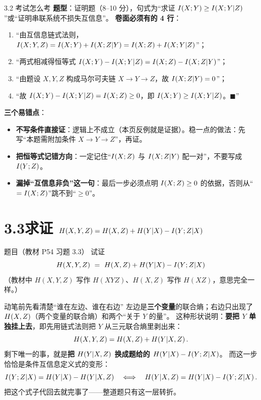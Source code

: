 \documentclass[11pt,a4paper]{ctexart}
\begin{document}
\begin{exam}{3.2 考试怎么考}
\textbf{题型}：证明题（8--10 分），句式为“求证 $I\!\left(X;Y\right)\ge I\!\left(X;Y|Z\right)$”或“证明串联系统不损失互信息”。
\textbf{卷面必须有的 4 行}：
\begin{enumerate}[leftmargin=1.7em,itemsep=1pt,topsep=1pt]
  \item “由互信息链式法则，$I\!\left(X;Y,Z\right)=I\!\left(X;Y\right)+I\!\left(X;Z|Y\right)=I\!\left(X;Z\right)+I\!\left(X;Y|Z\right)$”；
  \item “两式相减得恒等式 $I\!\left(X;Y\right)-I\!\left(X;Y|Z\right)=I\!\left(X;Z\right)-I\!\left(X;Z|Y\right)$”；
  \item “由题设 $X,Y,Z$ 构成马尔可夫链 $X\to Y\to Z$，故 $I\!\left(X;Z|Y\right)=0$”；
  \item “故 $I\!\left(X;Y\right)-I\!\left(X;Y|Z\right)=I\!\left(X;Z\right)\ge0$，即 $I\!\left(X;Y\right)\ge I\!\left(X;Y|Z\right)$。$\blacksquare$”
\end{enumerate}
\textbf{三个易错点}：
\begin{itemize}[leftmargin=1.5em,itemsep=1pt,topsep=1pt]
  \item \textbf{不写条件直接证}：逻辑上不成立（本页反例就是证据）。稳一点的做法：先写“本题需附加条件 $X\to Y\to Z$”，再证。
  \item \textbf{把恒等式记错方向}：一定记住“$I\!\left(X;Z\right)$ 与 $I\!\left(X;Z|Y\right)$ 配一对”，不要写成 $I\!\left(Y;Z\right)$。
  \item \textbf{漏掉“互信息非负”这一句}：最后一步必须点明 $I\!\left(X;Z\right)\ge0$ 的依据，否则从“$= I\!\left(X;Z\right)$”跳不到“$\ge0$”。
\end{itemize}
\end{exam}

\section{3.3\quad 求证 $H\!\left(X,Y,Z\right)=H\!\left(X,Z\right)+H\!\left(Y|X\right)-I\!\left(Y;Z|X\right)$}

\begin{defbox}{题目（教材 P54 习题 3.3）}
试证
\[
\Hx{X,Y,Z}\ =\ \Hx{X,Z}+\Hx{Y|X}-\I{Y;Z|X}
\]
（教材中 $H(X,Y,Z)$ 写作 $H(XYZ)$、$H(X,Z)$ 写作 $H(XZ)$，意思完全一样。）
\end{defbox}

\begin{idea}{动笔前先看清楚“谁在左边、谁在右边”}
左边是\textbf{三个变量}的联合熵；右边只出现了 $H\!\left(X,Z\right)$（两个变量的联合熵）和两个“关于 $Y$ 的量”。
这种形状说明：\textbf{要把 $Y$ 单独挂上去}，即先用链式法则把 $Y$ 从三元联合熵里剥出来：
\[
H\!\left(X,Y,Z\right)=H\!\left(X,Z\right)+H\!\left(Y|X,Z\right).
\]
剩下唯一的事，就是\textbf{把 $H\!\left(Y|X,Z\right)$ 换成题给的 $H\!\left(Y|X\right)-I\!\left(Y;Z|X\right)$}。
而这一步恰恰是条件互信息定义式的变形：
\[
I\!\left(Y;Z|X\right)=H\!\left(Y|X\right)-H\!\left(Y|X,Z\right)
\quad\Longleftrightarrow\quad
H\!\left(Y|X,Z\right)=H\!\left(Y|X\right)-I\!\left(Y;Z|X\right).
\]
把这个式子代回去就完事了——整道题只有这一层转折。
\end{idea}
\end{document}
